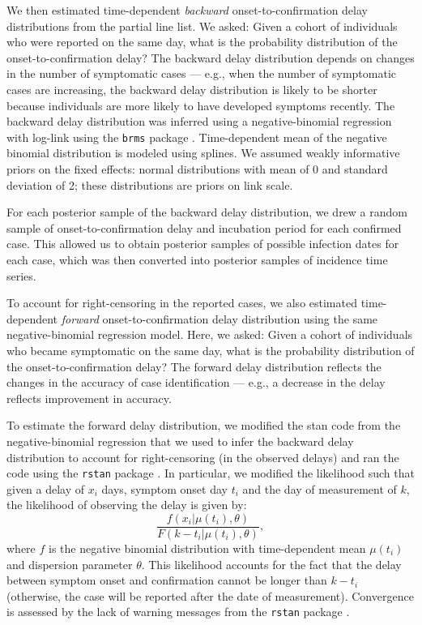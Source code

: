 We then estimated time-dependent \emph{backward} onset-to-confirmation delay distributions from the partial line list. We asked: Given a cohort of individuals who were reported on the same day, what is the probability distribution of the onset-to-confirmation delay?
The backward delay distribution depends on changes in the number of symptomatic cases ---
e.g., when the number of symptomatic cases are increasing, the backward delay distribution is likely to be shorter because individuals are more likely to have developed symptoms recently.
The backward delay distribution was inferred using a negative-binomial regression with log-link using the \texttt{brms} package \citep{burkner2017brms}.
Time-dependent mean of the negative binomial distribution is modeled using splines.
We assumed weakly informative priors on the fixed effects: normal distributions with mean of 0 and standard deviation of 2;
these distributions are priors on link scale.

For each posterior sample of the backward delay distribution, we drew a random sample of onset-to-confirmation delay and incubation period for each confirmed case. 
This allowed us to obtain posterior samples of possible infection dates for each case,
which was then converted into posterior samples of incidence time series.

To account for right-censoring in the reported cases, we also estimated time-dependent \emph{forward} onset-to-confirmation delay distribution using the same negative-binomial regression model.
Here, we asked: Given a cohort of individuals who became symptomatic on the same day, what is the probability distribution of the onset-to-confirmation delay?
The forward delay distribution reflects the changes in the accuracy of case identification --- e.g., a decrease in the delay reflects improvement in accuracy.

To estimate the forward delay distribution, we modified the stan code from the negative-binomial regression that we used to infer the backward delay distribution to account for right-censoring (in the observed delays) and ran the code using the \texttt{rstan} package \citep{rstan}.
In particular, we modified the likelihood such that given a delay of $x_i$ days, symptom onset day $t_i$ and the day of measurement of $k$, the likelihood of observing the delay is given by:
\begin{equation}
\frac{f(x_i|\mu(t_i), \theta)}{F(k-t_i|\mu(t_i), \theta)},
\end{equation}
where $f$ is the negative binomial distribution with time-dependent mean $\mu(t_i)$ and dispersion parameter $\theta$. This likelihood accounts for the fact that the delay between symptom onset and confirmation cannot be longer than $k-t_i$ (otherwise, the case will be reported after the date of measurement). Convergence is assessed by the lack of warning messages from the \texttt{rstan} package \citep{rstan}.

